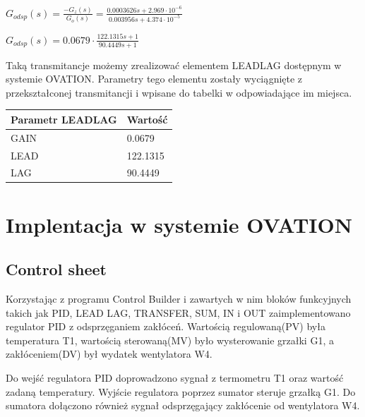 \documentclass{mwrep}
\begin{document}
\vspace{3mm}
$G_{odsp}(s) = \frac{-G_{z}(s)}{G_{o}(s)} = \frac{0.0003626 s + 2.969 \cdot 10^{-6}}{0.003956 s + 4.374 \cdot 10^{-5}}$

\vspace{3mm}
$G_{odsp}(s) = 0.0679 \cdot \frac{122.1315s + 1}{90.4449s +1}$

\vspace{3mm}

Taką transmitancje możemy zrealizować elementem LEADLAG dostępnym w systemie OVATION. Parametry tego elementu zostały wyciągnięte z przekształconej transmitancji i wpisane do tabelki w odpowiadające im miejsca.

\begin{table}[H]
\begin{tabular}{l|l}
Parametr LEADLAG & Wartość  \\ \hline
GAIN             & 0.0679   \\
LEAD             & 122.1315 \\
LAG              & 90.4449 
\end{tabular}
\end{table}

\chapter{Implentacja w systemie OVATION}
\label{OVATION}

\section{Control sheet}
\label{ControlSheet}

Korzystając z programu Control Builder i zawartych w nim bloków funkcyjnych takich jak PID, LEAD LAG, TRANSFER, SUM, IN i OUT zaimplementowano regulator PID z odsprzęganiem zakłóceń.  Wartością regulowaną(PV) była temperatura T1, wartością sterowaną(MV) było wysterowanie grzałki G1, a zakłóceniem(DV) był wydatek wentylatora W4.

Do wejść regulatora PID doprowadzono sygnał z termometru T1 oraz wartość zadaną temperatury. Wyjście regulatora poprzez sumator steruje grzałką G1. Do sumatora dołączono również sygnał odsprzęgający zakłócenie od wentylatora W4.
\end{document}
